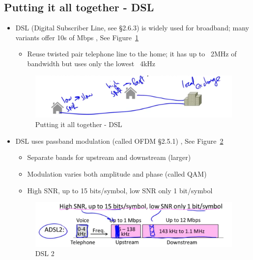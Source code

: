 \documentclass[12pt]{ctexart}   %
\begin{document}
	\subsection{Putting it all together - DSL}
	\begin{itemize}
		\item DSL (Digital Subscriber Line, see §2.6.3) is widely used for broadband; many variants offer 10s of Mbps , See Figure~\ref{fig:2-5-4}
		\begin{itemize}
			\item Reuse twisted pair telephone line to the home; it has up to ~2MHz of bandwidth but uses only the lowest ~4kHz
		\end{itemize}
			
		\begin{figure}[h!] %
		\centering
		 \includegraphics[scale=0.7]{images/2-5-4}
		\caption{ Putting it all together - DSL}
		 \label{fig:2-5-4}
		 \end{figure}
		
		\item DSL uses passband modulation (called OFDM §2.5.1) , See Figure~\ref{fig:2-5-5}
		\begin{itemize}
			\item Separate bands for upstream and downstream (larger)
			\item Modulation varies both amplitude and phase (called QAM)
			\item High SNR, up to 15 bits/symbol, low SNR only 1 bit/symbol
		\end{itemize}
		
		\begin{figure}[h!] %
		\centering
		 \includegraphics[scale=0.7]{images/2-5-5}
		\caption{ DSL 2}
		 \label{fig:2-5-5}
		 \end{figure}
		
	\end{itemize}
\end{document}
